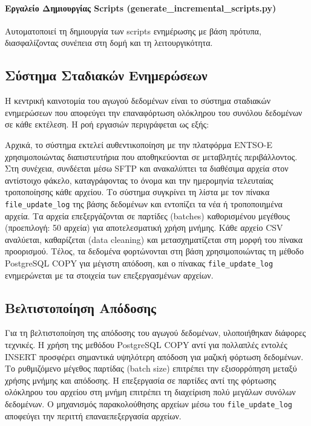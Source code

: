 \paragraph{Εργαλείο Δημιουργίας Scripts (generate\_incremental\_scripts.py)}
Αυτοματοποιεί τη δημιουργία των scripts ενημέρωσης με βάση πρότυπα, διασφαλίζοντας συνέπεια στη δομή και τη λειτουργικότητα.

\subsection{Σύστημα Σταδιακών Ενημερώσεων}
\label{subsec:incremental-updates}

Η κεντρική καινοτομία του αγωγού δεδομένων είναι το σύστημα σταδιακών ενημερώσεων που αποφεύγει την επαναφόρτωση ολόκληρου του συνόλου δεδομένων σε κάθε εκτέλεση. Η ροή εργασιών περιγράφεται ως εξής:

Αρχικά, το σύστημα εκτελεί αυθεντικοποίηση με την πλατφόρμα ENTSO-E χρησιμοποιώντας διαπιστευτήρια που αποθηκεύονται σε μεταβλητές περιβάλλοντος. Στη συνέχεια, συνδέεται μέσω SFTP και ανακαλύπτει τα διαθέσιμα αρχεία στον αντίστοιχο φάκελο, καταγράφοντας το όνομα και την ημερομηνία τελευταίας τροποποίησης κάθε αρχείου. Το σύστημα συγκρίνει τη λίστα με τον πίνακα \texttt{file\_update\_log} της βάσης δεδομένων και εντοπίζει τα νέα ή τροποποιημένα αρχεία. Τα αρχεία επεξεργάζονται σε παρτίδες (batches) καθορισμένου μεγέθους (προεπιλογή: 50 αρχεία) για αποτελεσματική χρήση μνήμης. Κάθε αρχείο CSV αναλύεται, καθαρίζεται (data cleaning) και μετασχηματίζεται στη μορφή του πίνακα προορισμού. Τέλος, τα δεδομένα φορτώνονται στη βάση χρησιμοποιώντας τη μέθοδο PostgreSQL COPY για μέγιστη απόδοση, και ο πίνακας \texttt{file\_update\_log} ενημερώνεται με τα στοιχεία των επεξεργασμένων αρχείων.

\subsection{Βελτιστοποίηση Απόδοσης}
\label{subsec:pipeline-performance}

Για τη βελτιστοποίηση της απόδοσης του αγωγού δεδομένων, υλοποιήθηκαν διάφορες τεχνικές. Η χρήση της μεθόδου PostgreSQL COPY αντί για πολλαπλές εντολές INSERT προσφέρει σημαντικά υψηλότερη απόδοση για μαζική φόρτωση δεδομένων. Το ρυθμιζόμενο μέγεθος παρτίδας (batch size) επιτρέπει την εξισορρόπηση μεταξύ χρήσης μνήμης και απόδοσης. Η επεξεργασία σε παρτίδες αντί της φόρτωσης ολόκληρου του αρχείου στη μνήμη επιτρέπει τη διαχείριση πολύ μεγάλων συνόλων δεδομένων. Ο μηχανισμός παρακολούθησης αρχείων μέσω του \texttt{file\_update\_log} αποφεύγει την περιττή επαναεπεξεργασία αρχείων.


